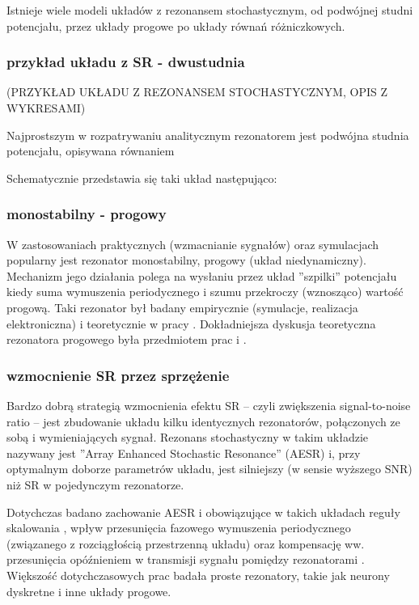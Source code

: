 \documentclass[12pt]{article}
\begin{document}
  Istnieje wiele modeli układów z rezonansem stochastycznym, od podwójnej studni potencjału, przez układy progowe po układy równań różniczkowych.

  \subsubsection{przykład układu z SR - dwustudnia}

  (PRZYKŁAD UKŁADU Z REZONANSEM STOCHASTYCZNYM, OPIS Z WYKRESAMI)

  Najprostszym w rozpatrywaniu analitycznym rezonatorem jest podwójna studnia potencjału, opisywana równaniem


  Schematycznie przedstawia się taki układ następująco:



  \subsubsection{monostabilny - progowy}

  W zastosowaniach praktycznych (wzmacnianie sygnałów) oraz symulacjach popularny jest rezonator monostabilny, progowy (układ niedynamiczny). Mechanizm jego działania polega na wysłaniu przez układ ''szpilki'' potencjału kiedy suma wymuszenia periodycznego i szumu przekroczy (wznosząco) wartość progową. Taki rezonator był badany empirycznie (symulacje, realizacja elektroniczna) i teoretycznie w pracy \cite{gingl_kiss_moss}. Dokładniejsza dyskusja teoretyczna rezonatora progowego była przedmiotem prac \cite{blondeau_e53} i \cite{blondeau_e55}.

  \subsubsection{wzmocnienie SR przez sprzężenie}

  Bardzo dobrą strategią wzmocnienia efektu SR -- czyli zwiększenia signal-to-noise ratio -- jest zbudowanie układu kilku identycznych rezonatorów, połączonych ze sobą i wymieniających sygnał. Rezonans stochastyczny w takim układzie nazywany jest ''Array Enhanced Stochastic Resonance'' (AESR) \cite{lindner_meadows} i, przy optymalnym doborze parametrów układu, jest silniejszy (w sensie wyższego SNR) niż SR w pojedynczym rezonatorze.

  Dotychczas badano zachowanie AESR i obowiązujące w takich układach reguły skalowania \cite{lindner_meadows}, wpływ przesunięcia fazowego wymuszenia periodycznego (związanego z rozciągłością przestrzenną układu) \cite{ijmpb_14_8} oraz kompensację ww. przesunięcia opóźnieniem w transmisji sygnału pomiędzy rezonatorami \cite{ijmpb_23_2}. Większość dotychczasowych prac badała proste rezonatory, takie jak neurony dyskretne i inne układy progowe.
\end{document}
